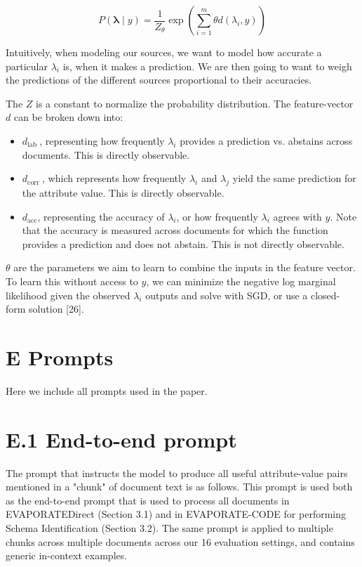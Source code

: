 \documentclass[10pt]{article}
\begin{document}
$$
P(\boldsymbol{\lambda} \mid y)=\frac{1}{Z_{\theta}} \exp \left(\sum_{i=1}^{m} \theta d\left(\lambda_{i}, y\right)\right)
$$

Intuitively, when modeling our sources, we want to model how accurate a particular $\lambda_{i}$ is, when it makes a prediction. We are then going to want to weigh the predictions of the different sources proportional to their accuracies.

The $Z$ is a constant to normalize the probability distribution. The feature-vector $d$ can be broken down into:

\begin{itemize}
  \item $d_{\text {lab }}$, representing how frequently $\lambda_{i}$ provides a prediction vs. abstains across documents. This is directly observable.

  \item $d_{\text {corr }}$, which represents how frequently $\lambda_{i}$ and $\lambda_{j}$ yield the same prediction for the attribute value. This is directly observable.

  \item $d_{\mathrm{acc}}$, representing the accuracy of $\lambda_{i}$, or how frequently $\lambda_{i}$ agrees with $y$. Note that the accuracy is measured across documents for which the function provides a prediction and does not abstain. This is not directly observable.

\end{itemize}

$\theta$ are the parameters we aim to learn to combine the inputs in the feature vector. To learn this without access to $y$, we can minimize the negative log marginal likelihood given the observed $\lambda_{i}$ outputs and solve with SGD, or use a closed-form solution [26].

\section{E Prompts}
Here we include all prompts used in the paper.

\section{E.1 End-to-end prompt}
The prompt that instructs the model to produce all useful attribute-value pairs mentioned in a "chunk" of document text is as follows. This prompt is used both as the end-to-end prompt that is used to process all documents in EVAPORATEDirect (Section 3.1) and in EVAPORATE-CODE for performing Schema Identification (Section 3.2). The same prompt is applied to multiple chunks across multiple documents across our 16 evaluation settings, and contains generic in-context examples.
\end{document}
